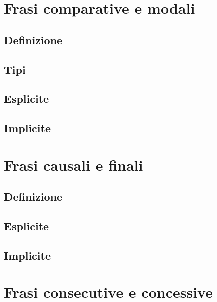 \documentclass[
  a4paper,
  twoside,
  11pt,
  chapterprefix=false,
  bibliography=totocnumbered,
  listof=flat]{scrbook}
\begin{document}
\hypertarget{frasi-comparative-e-modali}{%
\chapter{Frasi comparative e modali}\label{frasi-comparative-e-modali}}

\hypertarget{definizione-1}{%
\section{Definizione}\label{definizione-1}}

\hypertarget{tipi-2}{%
\section{Tipi}\label{tipi-2}}

\hypertarget{esplicite-3}{%
\section{Esplicite}\label{esplicite-3}}

\hypertarget{implicite-3}{%
\section{Implicite}\label{implicite-3}}

\hypertarget{frasi-causali-e-finali}{%
\chapter{Frasi causali e finali}\label{frasi-causali-e-finali}}

\hypertarget{definizione-2}{%
\section{Definizione}\label{definizione-2}}

\hypertarget{esplicite-4}{%
\section{Esplicite}\label{esplicite-4}}

\hypertarget{implicite-4}{%
\section{Implicite}\label{implicite-4}}

\hypertarget{frasi-consecutive-e-concessive}{%
\chapter{Frasi consecutive e concessive}\label{frasi-consecutive-e-concessive}}
\end{document}
